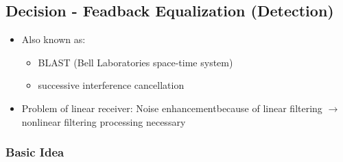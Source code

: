 \documentclass[a4paper, 10pt]{article}
\begin{document}
\subsection{Decision - Feadback Equalization (Detection)}
\begin{itemize}
	\item Also known as: 
	\begin{itemize}
		\item BLAST (Bell Laboratories space-time system)
		\item successive interference cancellation		
	\end{itemize}
	\item Problem of linear receiver: Noise enhancementbecause of linear filtering $\rightarrow$ nonlinear filtering processing necessary
\end{itemize}
\subsubsection{Basic Idea}
\end{document}
